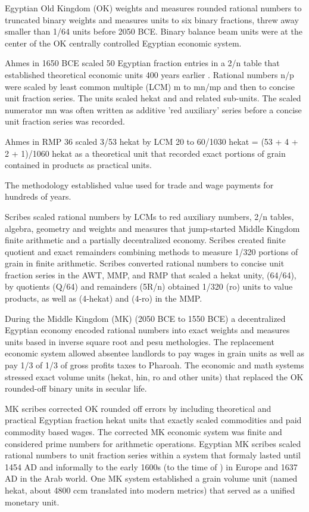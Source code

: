 \documentclass[12pt]{article}
\begin{document}
Egyptian Old Kingdom (OK) weights and measures rounded  rational numbers to truncated binary weights and measures units to six binary fractions, threw away smaller than 1/64 units before 2050 BCE. Binary balance beam units were at the center of the OK centrally controlled Egyptian economic system. 

Ahmes in 1650 BCE scaled 50 Egyptian fraction entries in a 2/n table that established theoretical economic units 400 years earlier . Rational numbers n/p were scaled by least common multiple (LCM) m to mn/mp and then to concise unit fraction series. The units scaled hekat and and related sub-units. The scaled numerator mn was often written as additive 'red auxiliary' series before a concise unit fraction series was recorded. 

Ahmes in RMP 36 scaled 3/53 hekat by LCM 20 to 60/1030 hekat = (53 + 4 + 2 + 1)/1060 hekat as a theoretical unit that recorded exact portions of grain contained in products as practical units.

The methodology established value used for trade and wage payments for hundreds of years.

Scribes scaled rational numbers by LCMs to red auxiliary numbers, 2/n tables, algebra, geometry and weights and measures that jump-started Middle Kingdom finite arithmetic and a partially decentralized economy. Scribes created finite quotient and exact remainders combining methods to measure 1/320 portions of grain in finite arithmetic. Scribes converted rational numbers to concise unit fraction series in the AWT, MMP, and RMP that scaled a hekat unity, (64/64), by quotients (Q/64) and remainders (5R/n) obtained 1/320 (ro) units to value products, as well as (4-hekat) and (4-ro) in the MMP.

During the Middle Kingdom (MK) (2050 BCE to 1550 BCE) a decentralized Egyptian economy encoded rational numbers into exact weights and measures units based in inverse square root and pesu methologies. The replacement economic system allowed absentee landlords to pay wages in grain units as well as pay 1/3 of 1/3 of gross profits taxes to Pharoah. The economic and math systems stressed exact volume units (hekat, hin, ro and other units) that replaced the OK rounded-off binary units in secular life. 

MK scribes corrected OK rounded off errors by including theoretical and practical Egyptian fraction hekat units that exactly scaled commodities and paid commodity based wages. The corrected MK economic system was finite and considered prime numbers for arithmetic operations. Egyptian MK scribes scaled rational numbers to unit fraction series within a system that formaly lasted until 1454 AD and informally to the early 1600s (to the time of )  in Europe and 1637 AD in the Arab world. One MK system established a grain volume unit (named hekat, about 4800 ccm translated into modern metrics) that served as a unified monetary unit.
\end{document}
